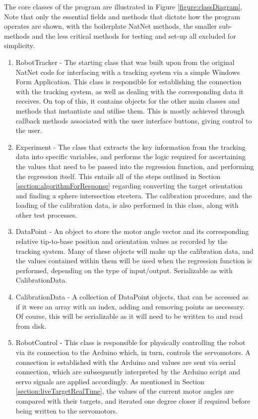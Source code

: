 \documentclass[11pt]{article}
\begin{document}
The core classes of the program are illustrated in Figure \ref{figure:classDiagram}. Note that only the essential fields and methods that dictate how the program operates are shown, with the boilerplate NatNet methods, the smaller sub-methods and the less critical methods for testing and set-up all excluded for simplicity.
\begin{enumerate}
\item{RobotTracker - The starting class that was built upon from the original NatNet code for interfacing with a tracking system via a simple Windows Form Application. This class is responsible for establishing the connection with the tracking system, as well as dealing with the corresponding data it receives. On top of this, it contains objects for the other main classes and methods that instantiate and utilise them. This is mostly achieved through callback methods associated with the user interface buttons, giving control to the user.}

\item{Experiment - The class that extracts the key information from the tracking data into specific variables, and performs the logic required for ascertaining the values that need to be passed into the regression function, and performing the regression itself. This entails all of the steps outlined in Section \ref{section:algorithmForResponse} regarding converting the target orientation and finding a sphere intersection etcetera. The calibration procedure, and the loading of the calibration data, is also performed in this class, along with other test processes.}

\item{DataPoint - An object to store the motor angle vector and its corresponding relative tip-to-base position and orientation values as recorded by the tracking system. Many of these objects will make up the calibration data, and the values contained within them will be used when the regression function is performed, depending on the type of input/output. Serializable as with CalibrationData.}

\item{CalibrationData - A collection of DataPoint objects, that can be accessed as if it were an array with an index, adding and removing points as necessary. Of course, this will be serializable as it will need to be written to and read from disk.}

\item{RobotControl - This class is responsible for physically controlling the robot via its connection to the Arduino which, in turn, controls the servomotors. A connection is established with the Arduino and values are sent via serial connection, which are subsequently interpreted by the Arduino script and servo signals are applied accordingly. As mentioned in Section \ref{section:liveTargetRealTime}, the values of the current motor angles are compared with their targets, and iterated one degree closer if required before being written to the servomotors.}


\end{enumerate}
\end{document}
